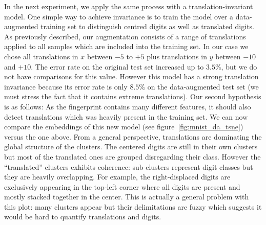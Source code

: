 \documentclass[a4paper,12pt]{report}
\begin{document}
In the next experiment, we apply the same process with a translation-invariant model.
One simple way to achieve invariance is to train the model over a data-augmented training set to distinguish centred digits as well as translated digits.
As previously described, our augmentation consists of a range of translations applied to all samples which are included into the training set.
In our case we chose all translations in $x$ between $-5$ to $+5$ plus translations in $y$ between $-10$ and $+10$.
The error rate on the original test set increased up to $3.5\%$, but we do not have comparisons for this value.
However this model has a strong translation invariance because its error rate is only $8.5\%$ on the data-augmented test set (we must stress the fact that it contains extreme translations).
Our second hypothesis is as follows: As the fingerprint contains many different features, it should also detect translations which was heavily present in the training set.
We can now compare the embeddings of this new model (see figure~\ref{fig:mnist_da_tsne}) versus the one above.
From a general perspective, translations are dominating the global structure of the clusters.
The centered digits are still in their own clusters but most of the translated ones are grouped disregarding their class.
However the ``translated'' clusters exhibits coherence: sub-clusters represent digit classes but they are heavily overlapping.
For example, the right-displaced digits are exclusively appearing in the top-left corner where all digits are present and mostly stacked together in the center.
This is actually a general problem with this plot: many clusters appear but their delimitations are fuzzy which suggests it would be hard to quantify translations and digits.
\end{document}
